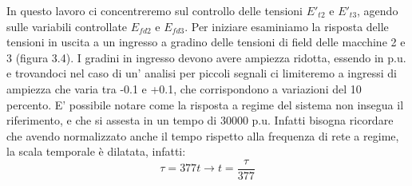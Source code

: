 \documentclass[Lau,noexaminfo]{sapthesis}
\begin{document}
\newpage	
	In questo lavoro ci concentreremo sul controllo delle tensioni $E'_{t2}$ e $E'_{t3}$, agendo sulle variabili controllate $E_{fd2}$ e $E_{fd3}$. Per iniziare esaminiamo la risposta delle tensioni in uscita a un ingresso a gradino delle tensioni di field delle macchine 2 e 3 (figura 3.4). I gradini in ingresso devono avere ampiezza ridotta, essendo in p.u. e trovandoci nel caso di un' analisi per piccoli segnali ci limiteremo a ingressi di ampiezza che varia tra -0.1 e +0.1, che corrispondono a variazioni del 10 percento. E' possibile notare come la risposta a regime del sistema non insegua il riferimento, e che si assesta in un tempo di 30000 p.u. Infatti bisogna ricordare che avendo normalizzato anche il tempo rispetto alla frequenza di rete a regime, la scala temporale è dilatata, infatti:\\
	\begin{equation}
	\tau=377t \rightarrow t=\frac{\tau}{377}
	\end{equation}
\end{document}
